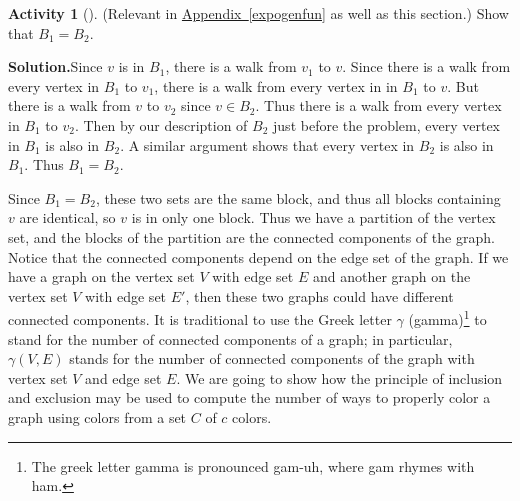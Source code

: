 \documentclass[10pt,]{book}
\theoremstyle{plain}
\theoremstyle{definition}
\newtheorem{activity}[project]{Activity}
\numberwithin{equation}{chapter}
\begin{document}
\begin{activity}[]\label{conncomp}
(Relevant in \hyperref[expogenfun]{Appendix~\ref{expogenfun}} as well as this section.) Show that \(B_1=B_2\).%
\par\medskip\noindent%
\textbf{Solution.}\quad Since \(v\) is in \(B_1\), there is a walk from \(v_1\) to \(v\). Since there is a walk from every vertex in \(B_1\) to \(v_1\), there is a walk from every vertex in in \(B_1\) to \(v\). But there is a walk from \(v\) to \(v_2\) since \(v\in B_2\). Thus there is a walk from every vertex in \(B_1\) to \(v_2\). Then by our description of \(B_2\) just before the problem, every vertex in \(B_1\) is also in \(B_2\). A similar argument shows that every vertex in \(B_2\) is also in \(B_1\). Thus \(B_1=B_2\).%
\end{activity}
Since \(B_1=B_2\), these two sets are the same block, and thus all blocks containing \(v\) are identical, so \(v\) is in only one block. Thus we have a partition of the vertex set, and the blocks of the partition are the connected components of the graph. Notice that the connected components depend on the edge set of the graph. If we have a graph on the vertex set \(V\) with edge set \(E\) and another graph on the vertex set \(V\) with edge set \(E'\), then these two graphs could have different connected components. It is traditional to use the Greek letter \(\gamma\) (gamma)\footnote{The greek  letter gamma is pronounced gam-uh, where gam rhymes with ham.\label{fn-16}} to stand for the number of connected components of a graph; in particular, \(\gamma(V,E)\) stands for the number of connected components of the graph with vertex set \(V\) and edge set \(E\). We are going to show how the principle of inclusion and exclusion may be used to compute the number of ways to properly color a graph using colors from a set \(C\) of \(c\) colors.%
\end{document}
